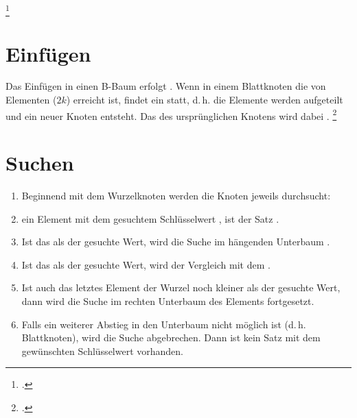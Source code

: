 \documentclass{lehramt-informatik-haupt}
\begin{document}
\footcite[Seite 32 (PDF 26)]{aud:fs:5}

%

\section{Einfügen}

Das Einfügen in einen B-Baum erfolgt .
Wenn in einem Blattknoten die  von Elementen
($2k$) erreicht ist, findet ein  statt, d.\,h. die
Elemente werden aufgeteilt und ein neuer Knoten entsteht. Das
 des ursprünglichen Knotens wird dabei .
\footcite[Seite 32 (PDF 26)]{aud:fs:5}

%

\section{Suchen}

\begin{enumerate}
\item Beginnend mit dem Wurzelknoten werden die Knoten jeweils
 durchsucht:

\item {} ein Element mit dem gesuchtem Schlüsselwert
, ist der Satz .

\item Ist das  als der gesuchte Wert, wird die
Suche im  hängenden Unterbaum .

\item Ist das  als der gesuchte Wert, wird der
Vergleich mit dem .

\item Ist auch das letztes Element der Wurzel noch kleiner als der
gesuchte Wert, dann wird die Suche im rechten Unterbaum des Elements
fortgesetzt.

\item Falls ein weiterer Abstieg in den Unterbaum nicht möglich ist
(d.\,h. Blattknoten), wird die Suche abgebrechen. Dann ist kein Satz mit
dem gewünschten Schlüsselwert vorhanden.
\end{enumerate}
\end{document}
